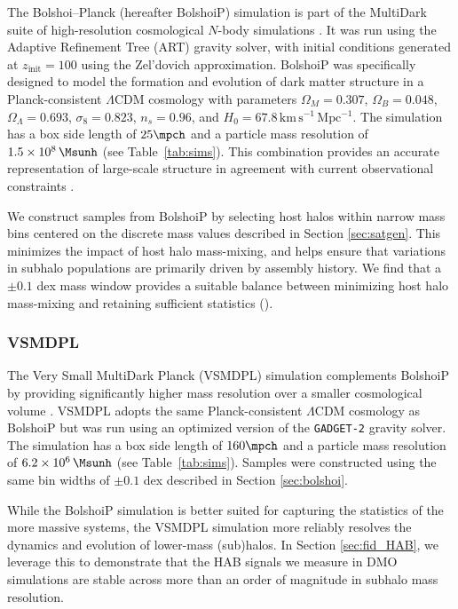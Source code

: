 The Bolshoi--Planck (hereafter BolshoiP) simulation is part of the MultiDark suite of high-resolution cosmological $N$-body simulations \citep{Klypin.etal.11, Riebe.etal.13, Klypin.etal.16, RodriguezPuebla.etal.16}. It was run using the Adaptive Refinement Tree (ART) gravity solver, with initial conditions generated at $z_{\mathrm{init}}=100$ using the Zel'dovich approximation. BolshoiP was specifically designed to model the formation and evolution of dark matter structure in a Planck-consistent $\Lambda$CDM cosmology with parameters $\Omega_{M}=0.307$, $\Omega_{B}=0.048$, $\Omega_{\Lambda}=0.693$, $\sigma_8 = 0.823$, $n_s=0.96$, and $H_0=67.8\,\mathrm{km\,s^{-1}\,Mpc^{-1}}$. The simulation has a box side length of $25 \mpch$ and a particle mass resolution of $1.5\times10^{8}\,\Msunh$ (see Table~\ref{tab:sims}). This combination provides an accurate representation of large-scale structure in agreement with current observational constraints \citep{Planck.18}.

We construct samples from BolshoiP by selecting host halos within narrow mass bins centered on the discrete mass values described in Section \ref{sec:satgen}. This minimizes the impact of host halo mass-mixing, and helps ensure that variations in subhalo populations are primarily driven by assembly history. We find that a $\pm 0.1$ dex mass window provides a suitable balance between minimizing host halo mass-mixing and retaining sufficient statistics ().

\subsubsection{VSMDPL}
\label{sec:vsmdpl}

The Very Small MultiDark Planck (VSMDPL) simulation complements BolshoiP by providing significantly higher mass resolution over a smaller cosmological volume \citep{Klypin.etal.16, RodriguezPuebla.etal.16}. VSMDPL adopts the same Planck-consistent $\Lambda$CDM cosmology as BolshoiP but was run using an optimized version of the \texttt{GADGET-2} gravity solver. The simulation has a box side length of $160 \mpch$ and a particle mass resolution of $6.2\times10^{6}\,\Msunh$ (see Table~\ref{tab:sims}). Samples were constructed using the same bin widths of $\pm 0.1$ dex described in Section \ref{sec:bolshoi}.

While the BolshoiP simulation is better suited for capturing the statistics of the more massive systems, the VSMDPL simulation more reliably resolves the dynamics and evolution of lower-mass (sub)halos. In Section \ref{sec:fid_HAB}, we leverage this to demonstrate that the HAB signals we measure in DMO simulations are stable across more than an order of magnitude in subhalo mass resolution. 






